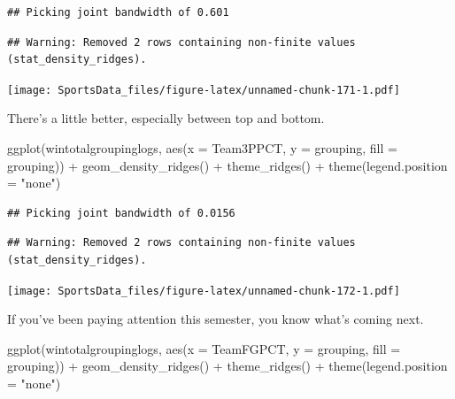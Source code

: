 \documentclass[
]{book}
\newenvironment{Shaded}{\begin{snugshade}}{\end{snugshade}}
\newcommand{\AttributeTok}[1]{\textcolor[rgb]{0.77,0.63,0.00}{#1}}
\newcommand{\FunctionTok}[1]{\textcolor[rgb]{0.00,0.00,0.00}{#1}}
\newcommand{\NormalTok}[1]{#1}
\newcommand{\SpecialCharTok}[1]{\textcolor[rgb]{0.00,0.00,0.00}{#1}}
\newcommand{\StringTok}[1]{\textcolor[rgb]{0.31,0.60,0.02}{#1}}
\begin{document}
\begin{verbatim}
## Picking joint bandwidth of 0.601
\end{verbatim}

\begin{verbatim}
## Warning: Removed 2 rows containing non-finite values (stat_density_ridges).
\end{verbatim}

\texttt{[image: SportsData\_files/figure-latex/unnamed-chunk-171-1.pdf]}

There's a little better, especially between top and bottom.

\begin{Shaded}
\begin{Highlighting}[]
\FunctionTok{ggplot}\NormalTok{(wintotalgroupinglogs, }\FunctionTok{aes}\NormalTok{(}\AttributeTok{x =}\NormalTok{ Team3PPCT, }\AttributeTok{y =}\NormalTok{ grouping, }\AttributeTok{fill =}\NormalTok{ grouping)) }\SpecialCharTok{+}
  \FunctionTok{geom\_density\_ridges}\NormalTok{() }\SpecialCharTok{+}
  \FunctionTok{theme\_ridges}\NormalTok{() }\SpecialCharTok{+} 
  \FunctionTok{theme}\NormalTok{(}\AttributeTok{legend.position =} \StringTok{"none"}\NormalTok{)}
\end{Highlighting}
\end{Shaded}

\begin{verbatim}
## Picking joint bandwidth of 0.0156
\end{verbatim}

\begin{verbatim}
## Warning: Removed 2 rows containing non-finite values (stat_density_ridges).
\end{verbatim}

\texttt{[image: SportsData\_files/figure-latex/unnamed-chunk-172-1.pdf]}

If you've been paying attention this semester, you know what's coming next.

\begin{Shaded}
\begin{Highlighting}[]
\FunctionTok{ggplot}\NormalTok{(wintotalgroupinglogs, }\FunctionTok{aes}\NormalTok{(}\AttributeTok{x =}\NormalTok{ TeamFGPCT, }\AttributeTok{y =}\NormalTok{ grouping, }\AttributeTok{fill =}\NormalTok{ grouping)) }\SpecialCharTok{+}
  \FunctionTok{geom\_density\_ridges}\NormalTok{() }\SpecialCharTok{+}
  \FunctionTok{theme\_ridges}\NormalTok{() }\SpecialCharTok{+} 
  \FunctionTok{theme}\NormalTok{(}\AttributeTok{legend.position =} \StringTok{"none"}\NormalTok{)}
\end{Highlighting}
\end{Shaded}
\end{document}
